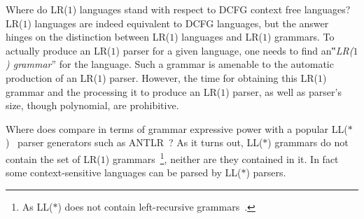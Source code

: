 Where do LR($1$) languages stand with respect to DCFG context free languages?
LR($1$) languages are indeed equivalent to DCFG languages, but
the answer hinges on the distinction
  between LR($1$) languages and LR($1$) grammars.
To actually produce an LR($1$) parser for a given language,
  one needs to find an‟\emph{LR($1$) grammar}” for the language.
Such a grammar is amenable to
  the automatic production of an LR($1$) parser.
However, the time for obtaining this LR($1$) grammar and the processing it to produce an LR($1$) parser,
  as well as parser's size,
  though polynomial, are prohibitive.

Where does \Self compare in terms of grammar expressive power with a popular LL($*$)~\cite{Parr:2011} parser generators such %
  as ANTLR~\cite{Parr:1995}?
As it turns out, LL($*$) grammars do not contain the set of LR($1$) grammars~\footnote{As LL($*$) does not contain left-recursive grammars~\cite{Parr:2011}.}, 
  neither are they contained in it. In fact some context-sensitive 
  languages can be parsed by LL($*$) parsers.